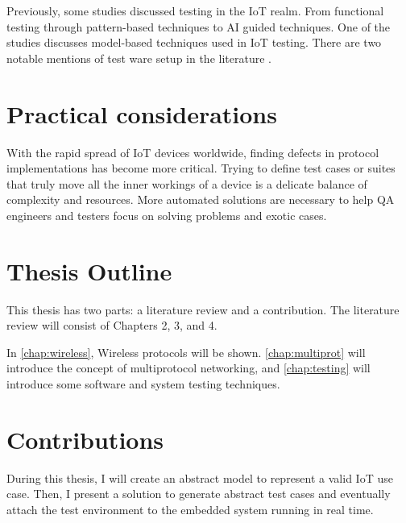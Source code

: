 Previously, some studies discussed testing in the IoT realm. From functional testing\cite{10.1145/3528227.3528568, 10.1145/3611643.3613888} through pattern-based techniques\cite{10.1145/3278186.3278196} to AI guided techniques\cite{10.1145/3387940.3392218, 10.1145/3539637.3558049}. One of the studies discusses model-based techniques used in IoT testing\cite{10.1145/3425329.3425330}. There are two notable mentions of test ware setup in the literature \cite{10.1145/3479239.3485708, 10.1145/3368235.3368832}.


\section{Practical considerations}

With the rapid spread of IoT devices worldwide, finding defects in protocol implementations has become more critical. Trying to define test cases or suites that truly move all the inner workings of a device is a delicate balance of complexity and resources. More automated solutions are necessary to help QA engineers and testers focus on solving problems and exotic cases.

\section{Thesis Outline}

This thesis has two parts: a literature review and a contribution. The literature review will consist of Chapters 2, 3, and 4.

In \autoref{chap:wireless}, Wireless protocols will be shown.
\autoref{chap:multiprot} will introduce the concept of multiprotocol networking, and \autoref{chap:testing} will introduce some software and system testing techniques.


\section{Contributions}
During this thesis, I will create an abstract model to represent a valid IoT use case. Then, I present a solution to generate abstract test cases and eventually attach the test environment to the embedded system running in real time.
